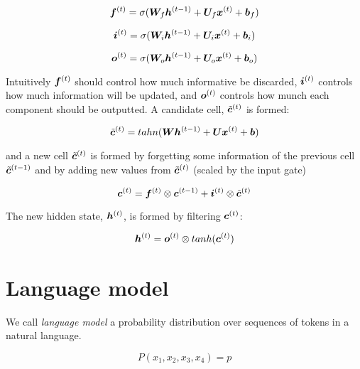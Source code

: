\begin{equation}
\bm{f}^{(t)} = \sigma(\bm{W}_{f} \bm{h}^{(t-1)} + \bm{U}_{f} \bm{x}^{(t)} + \bm{b}_{f})
\end{equation}

\begin{equation}
\bm{i}^{(t)} = \sigma(\bm{W}_{i} \bm{h}^{(t-1)} + \bm{U}_{i} \bm{x}^{(t)} + \bm{b}_{i})
\end{equation}

\begin{equation}
\bm{o}^{(t)} = \sigma(\bm{W}_{o} \bm{h}^{(t-1)} + \bm{U}_{o} \bm{x}^{(t)} + \bm{b}_{o})
\end{equation}

Intuitively $\bm{f}^{(t)}$ should control how much informative be discarded, $\bm{i}^{(t)}$ controls how much information will be updated, and $\bm{o}^{(t)}$ controls how munch each component should be outputted. A candidate cell, $\tilde{\bm{c}}^{(t)}$ is formed:

\begin{equation}
\tilde{\bm{c}}^{(t)} = tahn(\bm{W} \bm{h}^{(t-1)} + \bm{U} \bm{x}^{(t)} + \bm{b})
\end{equation}

and a new cell $\tilde{\bm{c}}^{(t)}$ is formed by forgetting some information of the previous cell $\tilde{\bm{c}}^{(t-1)}$ and by adding new values from $\tilde{\bm{c}}^{(t)}$ (scaled by the input gate)

\begin{equation}
\bm{c}^{(t)} = \bm{f}^{(t)} \otimes \bm{c}^{(t-1)} + \bm{i}^{(t)}\otimes \tilde{\bm{c}}^{(t)}
\end{equation}

The new hidden state, $\bm{h}^{(t)}$, is formed by filtering $\bm{c}^{(t)}$:

\begin{equation}
\bm{h}^{(t)} = \bm{o}^{(t)} \otimes tanh(\bm{c}^{(t)})
\end{equation}




\section{Language model}

We call \textit{language model} a probability distribution over sequences of tokens in a natural language.

\[
P(x_1,x_2,x_3,x_4) = p
\]

